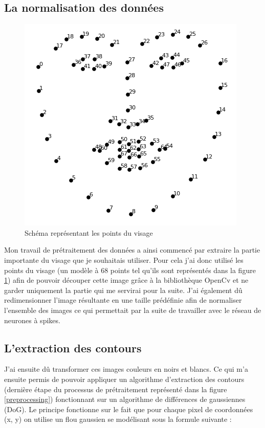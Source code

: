 \documentclass[12pt]{article}
\begin{document}
\subsection{La normalisation des données}

\begin{figure}
	\centering
  	\includegraphics[scale=0.40]{landmarks.png}
  	\caption{Schéma représentant les points du visage}
  	\label{landmarks}
\end{figure}

Mon travail de prétraitement des données a ainsi commencé par extraire la partie importante du visage que je souhaitais utiliser. Pour cela j'ai donc utilisé les points du visage (un modèle à 68 points tel qu'ils sont représentés dans la figure \ref{landmarks}) afin de pouvoir découper cette image grâce à la bibliothèque OpenCv et ne garder uniquement la partie qui me servirai pour la suite. J'ai également dû redimensionner l'image résultante en une taille prédéfinie afin de normaliser l'ensemble des images ce qui permettait par la suite de travailler avec le réseau de neurones à spikes.

\subsection{L'extraction des contours}

J'ai ensuite dû transformer ces images couleurs en noirs et blancs. Ce qui m'a ensuite permis de pouvoir appliquer un algorithme d'extraction des contours (dernière étape du processus de prétraitement représenté dans la figure \ref{preprocessing}) fonctionnant sur un algorithme de différences de gaussiennes (DoG). Le principe fonctionne sur le fait que pour chaque pixel de coordonnées (x, y) on utilise un flou gaussien se modélisant sous la formule suivante :
\end{document}
